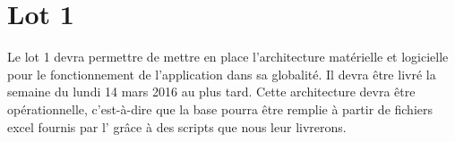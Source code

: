 \section{Lot 1}
	Le lot 1 devra permettre de mettre en place l'architecture matérielle et logicielle pour le fonctionnement de l'application dans sa globalité. Il devra être livré la semaine du lundi 14 mars 2016 au plus tard. Cette architecture devra être opérationnelle, c'est-à-dire que la base pourra être remplie à partir de fichiers excel fournis par l'\nomClient{} grâce à des scripts que nous leur livrerons.